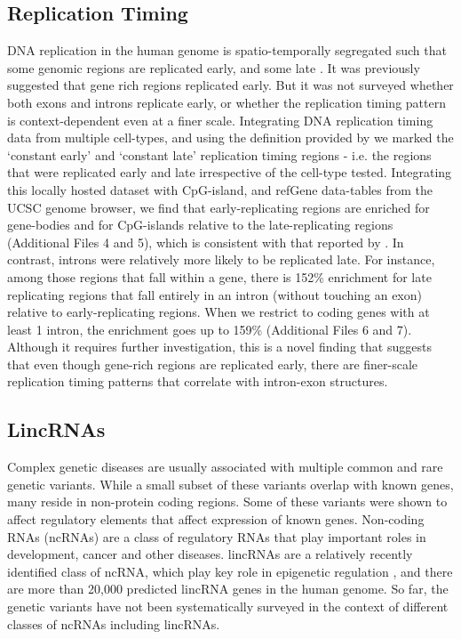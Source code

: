 \documentclass[10pt]{bmc_article}
\newenvironment{bmcformat}{\baselineskip20pt\sloppy\setboolean{publ}{false}}{\baselineskip20pt\sloppy}
\begin{document}
\begin{bmcformat}
\subsection*{Replication Timing}
DNA replication in the human genome is spatio-temporally segregated such that some genomic regions are replicated early, and some late \cite{Hansen}. It was previously suggested that gene rich regions replicated early. But it was not surveyed whether both exons and introns replicate early, or whether the replication timing pattern is context-dependent even at a finer scale. 
Integrating DNA replication timing data from multiple cell-types, and using the definition provided by \cite{Hansen} we marked the ‘constant early’ and ‘constant late’ replication timing regions - i.e. the regions that were replicated early and late irrespective of the cell-type tested. Integrating this locally hosted dataset with CpG-island, and refGene data-tables from the UCSC genome browser, we find  that early-replicating regions are enriched for gene-bodies and for CpG-islands relative to the late-replicating regions (Additional Files 4 and 5), which is consistent with that reported by \cite{Hansen}. In contrast, introns were relatively more likely to be replicated late. For instance, among those regions that fall within a gene, there is 152\% enrichment for late replicating regions that fall entirely in an intron (without touching an exon) relative to early-replicating regions. When we restrict to coding genes with at least 1 intron, the enrichment goes up to 159\% (Additional Files 6 and 7). Although it requires further investigation, this is a novel finding that suggests that even though gene-rich regions are replicated early, there are finer-scale replication timing patterns that correlate with intron-exon structures.

\subsection*{LincRNAs}
Complex genetic diseases are usually associated with multiple common and rare genetic variants. While a small subset of these variants overlap with known genes, many reside in non-protein coding regions. Some of these variants were shown to affect regulatory elements that affect expression of known genes. Non-coding RNAs (ncRNAs) are a class of regulatory RNAs that play important roles in development, cancer and other diseases. lincRNAs are a relatively recently identified class of ncRNA, which play key role in epigenetic regulation \cite{Lee}, and there are more than 20,000 predicted lincRNA genes in the human genome. So far, the genetic variants have not been systematically surveyed in the context of different classes of ncRNAs including lincRNAs. 


\end{bmcformat}
\end{document}
